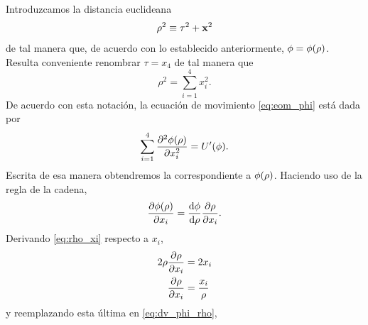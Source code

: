Introduzcamos la distancia euclideana
\begin{equation}
	\rho^2 \equiv \tau^2 + \vb{x}^2
\end{equation}
de tal manera que, de acuerdo con lo establecido anteriormente,  $\phi = \phi\qty(\rho)$. 
%
Resulta conveniente renombrar $\tau = x_4$ de tal manera que 
\begin{equation} \label{eq:rho_xi}
	\rho^2 = \sum_{i = 1}^{4} x_i^2.
\end{equation}
De acuerdo con esta notación, la ecuación de movimiento \eqref{eq:eom_phi} está dada por
\begin{equation} \label{eq:eom_xi}
\sum_{i = 1}^{4} \pdv[2]{\phi\qty(\rho)}{x_i} = U'\qty(\phi).
\end{equation}
Escrita de esa manera obtendremos 
la correspondiente a $\phi\qty(\rho)$. 
Haciendo uso de la regla de la cadena, 
\begin{equation} \label{eq:dv_phi_rho}
	\pdv{\phi\qty(\rho)}{x_i} = \dv{\phi}{\rho}\pdv{\rho}{x_i}.
\end{equation}
Derivando \eqref{eq:rho_xi} respecto a $x_i$,
\begin{align}
2\rho \pdv{\rho}{x_i} &= 2x_i \\ \label{eq:dv_rho_xi}
\pdv{\rho}{x_i} &= \frac{x_i}{\rho}
\end{align}
y reemplazando esta última
en \eqref{eq:dv_phi_rho}, 
